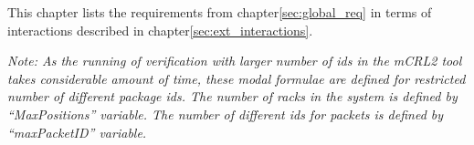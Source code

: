 
This chapter lists the requirements from chapter\ref{sec:global_req} in terms of interactions described in chapter\ref{sec:ext_interactions}.

\textit{Note: As the running of verification with larger number of ids in the mCRL2 tool takes considerable amount of time, these modal formulae are defined for restricted number of different package ids.
The number of racks in the system is defined by “MaxPositions” variable.
The number of different ids for packets is defined by “maxPacketID” variable.}\\

